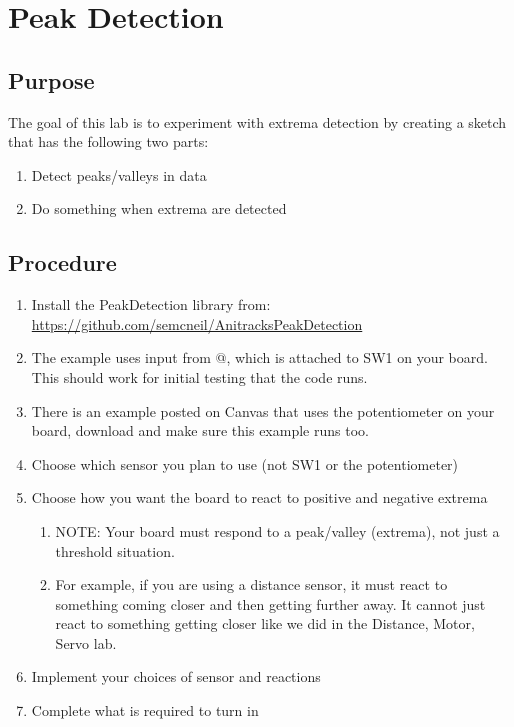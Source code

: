 \chapter{Peak Detection}



\section{Purpose}
The goal of this lab is to experiment with extrema detection by creating a sketch
that has the following two parts:
\begin{enumerate}
    \item Detect peaks/valleys in data 
    \item Do something when extrema are detected
\end{enumerate}



\section{Procedure}

\begin{enumerate}
    \item Install the PeakDetection library from:\\
          \href{https://github.com/semcneil/AnitracksPeakDetection}{https://github.com/semcneil/AnitracksPeakDetection}
    \item The example uses input from @, which is attached to SW1 on your board. 
            This should work for initial testing that the code runs.
    \item There is an example posted on Canvas that uses the potentiometer on your board, download
            and make sure this example runs too.
    \item Choose which sensor you plan to use (not SW1 or the potentiometer)
    \item Choose how you want the board to react to positive and negative extrema 
    \begin{enumerate}
        \item NOTE: Your board must respond to a peak/valley (extrema), not just a threshold situation.
        \item For example, if you are using a distance sensor, it must react to something
                coming closer and then getting further away. It cannot just react to something 
                getting closer like we did in the Distance, Motor, Servo lab.
    \end{enumerate}
    \item Implement your choices of sensor and reactions
    \item Complete what is required to turn in
\end{enumerate}

